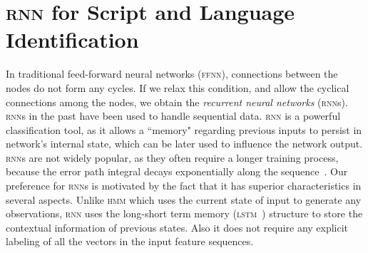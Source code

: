 \section{\textsc{rnn} for Script and Language Identification}
\label{sec:scriptLangId}
In traditional feed-forward neural networks (\textsc{ffnn}), connections between the nodes do not form any cycles. If we relax this condition, and allow the cyclical connections among the nodes, we obtain the \textit{recurrent neural networks} (\textsc{rnn}s). \textsc{rnn}s in the past have been used to handle sequential data. \textsc{rnn} is a powerful classification tool, as it allows a ``memory" regarding previous inputs to persist in network's internal state, which can be  later used to influence the network output. \textsc{rnn}s are not widely popular, as they often require a longer training process, because the error path integral decays exponentially along the sequence~\cite{Schmidhuber97}. Our preference for \textsc{rnn}s is motivated by the fact that it has superior characteristics in several aspects. %
Unlike \textsc{hmm} which uses the current state of input to generate any observations, \textsc{rnn} uses the long-short term memory (\textsc{lstm}~\cite{GravesLFBBS09}) structure to store the contextual information of previous states. Also it does not require any explicit labeling of all the vectors in the input feature sequences.

